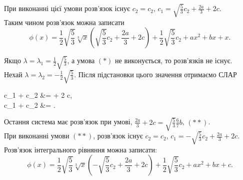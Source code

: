 \begin{solution*}
	При виконанні цієї умови розв'язок існує $c_2 = c_2$, $c_1 = \sqrt{\frac{5}{3}} c_2 + \frac{2a}{3} + 2c$. \\

	Таким чином розв'язок можна записати \[ \phi(x) = \dfrac{1}{2} \sqrt{\dfrac{5}{3}} \sqrt[3]{x} \left( \sqrt{\dfrac{5}{3}} c_2 + \dfrac{2a}{3} + 2c \right) + \dfrac{1}{2} \sqrt{\dfrac{5}{3}} c_2 + ax^2 + bx + x. \]

	Якщо $\lambda = \lambda_1 = \frac{1}{2} \sqrt{\frac{5}{3}}$, а умова $(*)$ не виконується, то розв'язків не існує. \\

	Нехай $\lambda = \lambda_2 = - \frac{1}{2} \sqrt{\frac{5}{3}}$. Після підстановки цього значення отримаємо СЛАР
	\begin{system*}
		c_1 +  c_2 &=  + 2 c, \\
		c_1 +  c_2 &=  .
	\end{system*}

	Остання система має розв'язок при умові, $\frac{2a}{3} + 2c = \sqrt{\frac{5}{3}} \frac{6}{7} b$, $(**)$. \\

	При виконанні умови $(**)$, розв’язок існує $c_2 = c_2$, $c_1 = - \sqrt{\frac{5}{3}} c_2 + \frac{2a}{3} + 2c$. \\

	Розв'язок інтегрального рівняння можна записати: \[ \phi(x) = \dfrac{1}{2} \sqrt{\dfrac{5}{3}} \sqrt[3]{x} \left( -\sqrt{\dfrac{5}{3}} c_2 + \dfrac{2a}{3} + 2c \right) + \dfrac{1}{2} \sqrt{\dfrac{5}{3}} c_2 + ax^2 + bx + c. \]
\end{solution*}